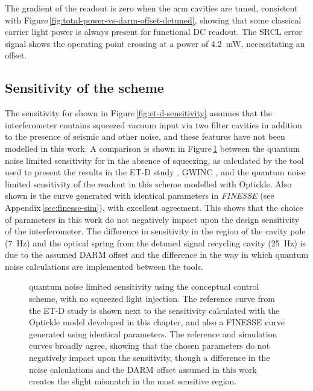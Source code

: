 The gradient of the \ASDC{} readout is zero when the arm cavities are tuned, consistent with Figure\,\ref{fig:total-power-vs-darm-offset-detuned}, showing that some classical carrier light power is always present for functional \gls{DC} readout. The \gls{SRCL} error signal shows the operating point crossing at a power of \SI{4.2}{\milli\watt}, necessitating an offset.

\subsection{Sensitivity of the scheme}
The sensitivity for \ETLF{} shown in Figure\,\ref{fig:et-d-sensitivity} assumes that the interferometer contains squeezed vacuum input via two filter cavities in addition to the presence of seismic and other noise, and these features have not been modelled in this work. A comparison is shown in Figure\,\ref{fig:et-lf-control-scheme-sensitivity} between the quantum noise limited sensitivity for \ETLF{} in the absence of squeezing, as calculated by the tool used to present the results in the ET-D study \cite{Hild2011}, \gls{GWINC} \cite{gwinc}, and the quantum noise limited sensitivity of the \ASDC{} readout in this scheme modelled with Optickle. Also shown is the curve generated with identical parameters in \emph{\gls{FINESSE}} (see Appendix\,\ref{sec:finesse-sim}), with excellent agreement. This shows that the choice of parameters in this work do not negatively impact upon the design sensitivity of the interferometer. The difference in sensitivity in the region of the cavity pole (\SI{7}{\hertz}) and the optical spring from the detuned signal recycling cavity (\SI{25}{\hertz}) is due to the assumed \gls{DARM} offset and the difference in the way in which quantum noise calculations are implemented between the tools.

\begin{figure}
  \centering
  
  \caption[ET-LF quantum noise limited sensitivity using the conceptual control scheme]{\label{fig:et-lf-control-scheme-sensitivity}\ETLF{} quantum noise limited sensitivity using the conceptual control scheme, with no squeezed light injection. The reference curve from the ET-D study is shown next to the sensitivity calculated with the Optickle model developed in this chapter, and also a \gls{FINESSE} curve generated using identical parameters. The reference and simulation curves broadly agree, showing that the chosen parameters do not negatively impact upon the sensitivity, though a difference in the noise calculations and the \gls{DARM} offset assumed in this work creates the slight mismatch in the most sensitive region.}
\end{figure}

